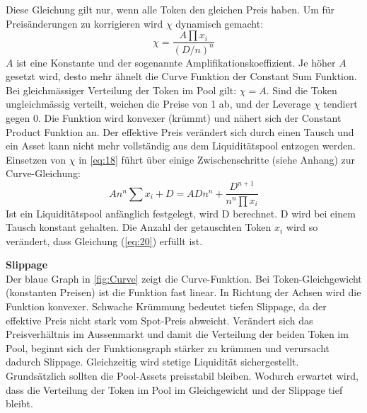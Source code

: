 \documentclass[12pt,a4paper,titlepage,oneside,english]{article}
\begin{document}
Diese Gleichung gilt nur, wenn alle Token den gleichen Preis haben. %
Um für Preisänderungen zu korrigieren wird $\chi$ dynamisch gemacht:
\begin{equation}
\chi = \dfrac{A \prod x_{i}}{(D/n)^n} \label{eq:19}
\end{equation}
$A$ ist eine Konstante und der sogenannte Amplifikationskoeffizient. %
Je höher $A$ gesetzt wird, desto mehr ähnelt die Curve Funktion der Constant Sum Funktion.
Bei gleichmässiger Verteilung der Token im Pool gilt: $\chi = A$. %
Sind die Token ungleichmässig verteilt, weichen die Preise von 1 ab, und der Leverage $\chi$ tendiert gegen 0. Die Funktion wird konvexer (krümmt) und nähert sich der Constant Product Funktion an. Der effektive Preis verändert sich durch einen Tausch und ein Asset kann nicht mehr vollständig aus dem Liquiditätspool entzogen werden. Einsetzen von $\chi$ in \ref{eq:18} führt über einige Zwischenschritte (siehe Anhang)%
zur Curve-Gleichung:
\begin{equation}
An^n\sum x_{i}+D = ADn^n + \dfrac{D^{n+1}}{n^{n} \prod x_{i}} \label{eq:20}
\end{equation}
Ist ein Liquiditätspool anfänglich festgelegt, wird D berechnet. D wird bei einem Tausch konstant gehalten. Die Anzahl der getauschten Token $x_{i}$ wird so verändert, dass Gleichung (\ref{eq:20}) erfüllt ist. 

\textbf{Slippage}\\
Der blaue Graph in \autoref{fig:Curve} zeigt die Curve-Funktion. Bei Token-Gleichgewicht (konstanten Preisen) ist die Funktion fast linear. In Richtung der Achsen wird die Funktion konvexer. Schwache Krümmung bedeutet tiefen Slippage, da der effektive Preis nicht stark vom Spot-Preis abweicht. Verändert sich das Preisverhältnis im Aussenmarkt und damit die Verteilung der beiden Token im Pool, beginnt sich der Funktionsgraph stärker zu krümmen und verursacht dadurch Slippage.  Gleichzeitig wird stetige Liquidität sichergestellt. Grundsätzlich sollten die Pool-Assets preisstabil bleiben. Wodurch erwartet wird, dass die Verteilung der Token im Pool im Gleichgewicht und der Slippage tief bleibt. \citep[vgl.][S.3f.]{Egorov2019}

\end{document}
